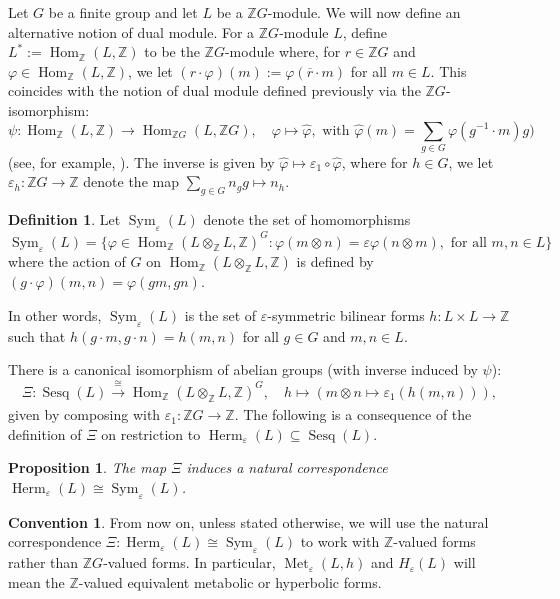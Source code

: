 \documentclass[11pt,a4paper,leqno]{amsart}
\newtheorem{proposition}[theorem]{Proposition}
\theoremstyle{definition}
\newtheorem{definition}[theorem]{Definition}
\newtheorem{convention}[theorem]{Convention}
\theoremstyle{remark}
\newcommand{\Z}{\mathbb{Z}}
\newcommand{\ol}{\overline}
\DeclareMathOperator{\Hom}{Hom}
\DeclareMathOperator{\Sesq}{Sesq}
\DeclareMathOperator{\Herm}{Herm}
\newcommand{\bZ}{\mathbb Z}
\DeclareMathOperator{\Met}{Met}
\newcommand{\ep}{\varepsilon}
\DeclareMathOperator{\Sym}{Sym}
\begin{document}
Let $G$ be a finite group and let $L$ be a $\Z G$-module. 
We will now define an alternative notion of dual module.
For a $\Z G$-module $L$, define $L^* := \Hom_{\Z}(L,\Z)$ to be the $\Z G$-module where, for $r \in \Z G$ and $\varphi \in \Hom_{\Z}(L,\Z)$, we let $(r \cdot \varphi)(m) := \varphi(\ol{r} \cdot m)$ for all $m \in L$.  
This coincides with the notion of dual module defined previously via the $\Z G$-isomorphism:
\[ \psi\colon \Hom_{\Z}(L,\Z) \to \Hom_{\Z G}(L,\Z G), \quad \varphi \mapsto \widehat\varphi,  \text{\ with \ } \widehat\varphi(m)=  \sum_{g \in G} \varphi(g^{-1} \cdot m)g ) \]
(see, for example, \cite[VI.3.4]{Brown:1994}). The inverse is given by $\widehat\varphi \mapsto \varepsilon_1\circ \widehat\varphi$, where for $h \in G$, we let $\varepsilon_h\colon \Z G \to \Z$ denote the map $\sum_{g \in G} n_g g \mapsto n_h$.

\begin{definition}\label{def:fourtwo}
 Let $\Sym_\ep(L)$ denote the set of homomorphisms
$$\Sym_\ep(L)= \{\varphi \in \Hom_{\Z}(L \otimes_{\Z} L,\Z)^G : \varphi(m \otimes n) = \ep\varphi(n \otimes m), \text{\ for all\ } m,n \in L\}$$
 where the action of $G$ on $\Hom_{\Z}(L \otimes_{\Z} L,\Z)$ is defined by $(g \cdot \varphi)(m,n) = \varphi(gm,  gn)$.

In other words, $\Sym_\ep(L)$ is the set of $\ep$-symmetric bilinear forms $h \colon L \times L \to \bZ$ such that  $h(g \cdot m,g \cdot n) = h(m,n)$ for all $g \in G$ and $m,n \in L$.
\end{definition}

There is a canonical isomorphism of abelian groups (with inverse induced by $\psi$):
\[ \Xi\colon \Sesq(L) \xrightarrow[]{\cong} \Hom_{\Z}(L \otimes_{\Z} L,\Z)^G, \quad h \mapsto (m \otimes n \mapsto \varepsilon_1(h(m,n))), \]
given by composing with $\varepsilon_1\colon \Z G \to \Z$.
The following is a consequence of the definition of $\Xi$ on restriction to $\Herm_\ep(L) \subseteq \Sesq(L)$.

\begin{proposition} The map $\Xi$ induces a natural correspondence $\Herm_\ep(L)\cong \Sym_\ep(L)$.
\end{proposition}

\begin{convention}
From now on, unless stated otherwise, we will use the natural correspondence $\Xi\colon \Herm_\ep(L)\cong \Sym_\ep(L)$ to work with $\Z$-valued forms rather than $\Z G$-valued forms. In particular, 
$\Met_\ep (L,h)$ and $H_\ep(L)$ will mean the $\bZ$-valued equivalent metabolic or hyperbolic forms.
\end{convention}
\end{document}
